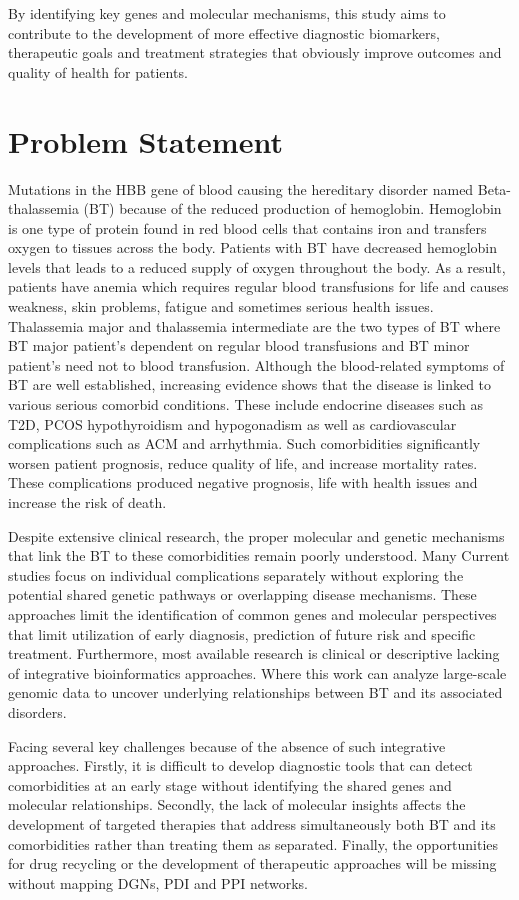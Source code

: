 By identifying key genes and molecular mechanisms, this study aims to contribute to the development of more effective diagnostic biomarkers, therapeutic goals and treatment strategies that obviously improve outcomes and quality of health for patients.

\section{Problem Statement}
\label{sec:sec1_4}
Mutations in the HBB gene of blood causing the hereditary disorder named Beta-thalassemia (BT) because of the reduced production of hemoglobin. Hemoglobin is one type of protein found in red blood cells that contains iron and transfers oxygen to tissues across the body. Patients with BT have decreased hemoglobin levels that leads to a reduced supply of oxygen throughout the body.  As a result, patients have anemia which requires regular blood transfusions for life and causes weakness, skin problems, fatigue and sometimes serious health issues. Thalassemia major and thalassemia intermediate are the two types of BT where BT major patient's dependent on regular blood transfusions \cite{b9} and BT minor patient's need not to blood transfusion. Although the blood-related symptoms of BT are well established, increasing evidence shows that the disease is linked to various serious comorbid conditions. These include endocrine diseases such as T2D, PCOS hypothyroidism and hypogonadism as well as cardiovascular complications such as ACM and arrhythmia. Such comorbidities significantly worsen patient prognosis, reduce quality of life, and increase mortality rates. These complications produced negative prognosis, life with health issues and increase the risk of death.

Despite extensive clinical research, the proper molecular and genetic mechanisms that link the BT to these comorbidities remain poorly understood. Many Current studies focus on individual complications separately without exploring the potential shared genetic pathways or overlapping disease mechanisms. These approaches limit the identification of common genes and molecular perspectives that limit utilization of early diagnosis, prediction of future risk and specific treatment. Furthermore, most available research is clinical or descriptive lacking of integrative bioinformatics approaches. Where this work can analyze large-scale genomic data to uncover underlying relationships between BT and its associated disorders.

Facing several key challenges because of the absence of such integrative approaches. Firstly, it is difficult to develop diagnostic tools that can detect comorbidities at an early stage without identifying the shared genes and molecular relationships. Secondly, the lack of molecular insights affects the development of targeted therapies that address simultaneously both BT and its comorbidities rather than treating them as separated. Finally, the opportunities for drug recycling or the development of therapeutic approaches will be missing without mapping DGNs, PDI and PPI networks.

